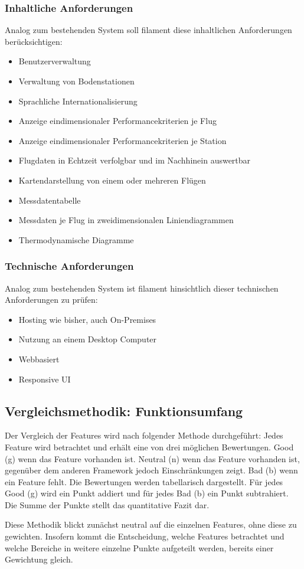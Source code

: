 \subsubsection{Inhaltliche Anforderungen}
Analog zum bestehenden System soll filament diese inhaltlichen Anforderungen berücksichtigen:
\begin{itemize}
    \item Benutzerverwaltung
    \item Verwaltung von Bodenstationen
    \item Sprachliche Internationalisierung
    \item Anzeige eindimensionaler Performancekriterien je Flug
    \item Anzeige eindimensionaler Performancekriterien je Station
    \item Flugdaten in Echtzeit verfolgbar und im Nachhinein auswertbar
    \item Kartendarstellung von einem oder mehreren Flügen
    \item Messdatentabelle
    \item Messdaten je Flug in zweidimensionalen Liniendiagrammen
    \item Thermodynamische Diagramme
\end{itemize}

\subsubsection{Technische Anforderungen}
Analog zum bestehenden System ist filament hinsichtlich dieser technischen Anforderungen zu prüfen:
\begin{itemize}
    \item Hosting wie bisher, auch On-Premises
    \item Nutzung an einem Desktop Computer
    \item Webbasiert
    \item Responsive UI
\end{itemize}

\newpage

\subsection{Vergleichsmethodik: Funktionsumfang}
Der Vergleich der Features wird nach folgender Methode durchgeführt:
Jedes Feature wird betrachtet und erhält eine von drei möglichen Bewertungen.
Good (g) wenn das Feature vorhanden ist.
Neutral (n) wenn das Feature vorhanden ist, gegenüber dem anderen Framework jedoch Einschränkungen zeigt.
Bad (b) wenn ein Feature fehlt.
Die Bewertungen werden tabellarisch dargestellt.
Für jedes Good (g) wird ein Punkt addiert und für jedes Bad (b) ein Punkt subtrahiert.
Die Summe der Punkte stellt das quantitative Fazit dar.

Diese Methodik blickt zunächst neutral auf die einzelnen Features, ohne diese zu gewichten.
Insofern kommt die Entscheidung, welche Features betrachtet und welche Bereiche in weitere einzelne Punkte aufgeteilt werden, bereits einer Gewichtung gleich.
